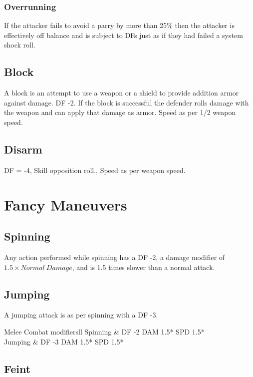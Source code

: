 \subsubsection{Overrunning}

If the attacker fails to avoid a parry by more than 25\% then the
attacker is effectively off balance and is subject to DFs just as if
they had failed a system shock roll.

\subsection{Block}

A block is an attempt to use a weapon or a shield to provide addition
armor against damage. DF -2. If the block is successful the defender rolls
damage with the weapon and can apply that damage as armor. Speed as per
1/2 weapon speed.

\subsection{Disarm}
DF = -4, Skill opposition roll., Speed as per weapon speed.

\section{Fancy Maneuvers}

\subsection{Spinning}

Any action performed while spinning has a DF -2, a damage modifier
of \( 1.5 \times Normal\ Damage \), and is 1.5 times slower than a
normal attack.

\subsection{Jumping}

A jumping attack is as per spinning with a DF -3.

\begin{stable}{Melee Combat modifiers}{ll}
	Spinning		 &		  DF -2 DAM 1.5* SPD 1.5* \\
	Jumping		&		  DF -3 DAM 1.5* SPD 1.5* \\
\end{stable}

\subsection{Feint}


